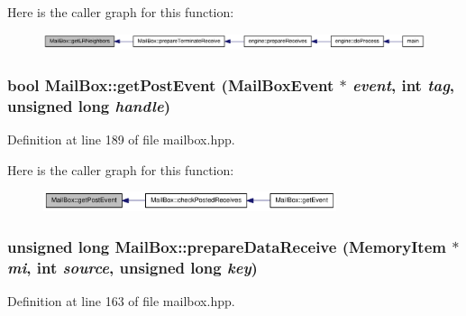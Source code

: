 Here is the caller graph for this function:\nopagebreak
\begin{figure}[H]
\begin{center}
\leavevmode
\includegraphics[width=374pt]{class_mail_box_a1fb17b7247e23d29fc0f51e980717acf_icgraph}
\end{center}
\end{figure}
\hypertarget{class_mail_box_ad63db95e264ebb4d4bf090ad3e3d0394}{
\subsubsection[{getPostEvent}]{\setlength{\rightskip}{0pt plus 5cm}bool MailBox::getPostEvent ({\bf MailBoxEvent} $\ast$ {\em event}, \/  int {\em tag}, \/  unsigned long {\em handle})}}
\label{class_mail_box_ad63db95e264ebb4d4bf090ad3e3d0394}


Definition at line 189 of file mailbox.hpp.

Here is the caller graph for this function:\nopagebreak
\begin{figure}[H]
\begin{center}
\leavevmode
\includegraphics[width=244pt]{class_mail_box_ad63db95e264ebb4d4bf090ad3e3d0394_icgraph}
\end{center}
\end{figure}
\hypertarget{class_mail_box_a467ff1952f56669a619092d57824637d}{
\subsubsection[{prepareDataReceive}]{\setlength{\rightskip}{0pt plus 5cm}unsigned long MailBox::prepareDataReceive ({\bf MemoryItem} $\ast$ {\em mi}, \/  int {\em source}, \/  unsigned long {\em key})}}
\label{class_mail_box_a467ff1952f56669a619092d57824637d}


Definition at line 163 of file mailbox.hpp.

